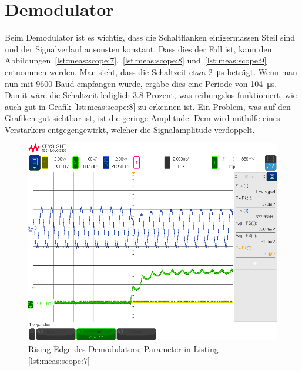 \section{Demodulator}
\label{sec:val:demodulator}

Beim  Demodulator  ist  es   wichtig,  dass  die  Schaltflanken  einigermassen
Steil  sind  und   der  Signalverlauf  ansonsten  konstant.    Dass  dies  der
Fall ist,  kann den Abbildungen~\ref{lst:meas:scope:7},~\ref{lst:meas:scope:8}
und~\ref{lst:meas:scope:9} entnommen  werden.  Man sieht, dass  die Schaltzeit
etwa  \SI{2}{\micro\second} betr\"agt. Wenn  man nun  mit 9600  Baud empfangen
w\"urde,  erg\"abe dies  eine  Periode  von \SI{104}{\micro\second}.   Damit
w\"are die Schaltzeit lediglich 3.8 Prozent, was reibungslos funktioniert, wie
auch gut in  Grafik \ref{lst:meas:scope:8} zu erkennen ist.   Ein Problem, was
auf  den  Grafiken gut  sichtbar  ist,  ist  die geringe  Amplitude. Dem  wird
mithilfe  eines  Verst\"arkers  entgegengewirkt, welcher  die  Signalamplitude
verdoppelt.

\begin{figure}[h!tb]
    \centering
    \includegraphics[width=1\textwidth, trim=0mm 21mm 0mm 11mm, clip]{images/scopeShots/scope_7b.png}
    \caption{Rising Edge des Demodulators, Parameter in Listing \ref{lst:meas:scope:7}}
    \label{fig:meas:scope:7}
\end{figure}

